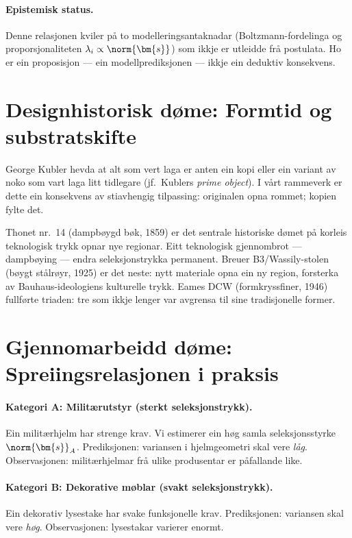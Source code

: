 \paragraph{Epistemisk status.}
Denne relasjonen kviler på to modelleringsantaknadar
(Boltzmann-fordelinga og proporsjonaliteten
$\lambda_i \propto \norm{\bm{s}}$) som ikkje er utleidde frå
postulata. Ho er ein proposisjon --- ein modellprediksjonen ---
ikkje ein deduktiv konsekvens.


\section{Designhistorisk døme: Formtid og substratskifte}

George Kubler hevda at alt som vert laga er anten ein kopi eller
ein variant av noko som vart laga litt tidlegare
(jf.\ Kublers \emph{prime object}). I vårt rammeverk er dette ein
konsekvens av stiavhengig tilpassing: originalen opna rommet;
kopien fylte det.

Thonet nr.~14 (dampbøygd bøk, 1859) er det sentrale historiske
dømet på korleis teknologisk trykk opnar nye regionar. Eitt
teknologisk gjennombrot --- dampbøying --- endra seleksjonstrykka
permanent. Breuer B3/Wassily-stolen (bøygt stålrøyr, 1925) er
det neste: nytt materiale opna ein ny region, forsterka av
Bauhaus-ideologiens kulturelle trykk. Eames DCW (formkryssfiner,
1946) fullførte triaden: tre som ikkje lenger var avgrensa til
sine tradisjonelle former.


\section{Gjennomarbeidd døme: Spreiingsrelasjonen i praksis}

\paragraph{Kategori A: Militærutstyr (sterkt seleksjonstrykk).}
Ein militærhjelm har strenge krav. Vi estimerer ein høg samla
seleksjonsstyrke $\norm{\bm{s}}_A$.
Prediksjonen: variansen i hjelmgeometri skal vere \emph{låg}.
Observasjonen: militærhjelmar frå ulike produsentar er påfallande
like.

\paragraph{Kategori B: Dekorative møblar (svakt seleksjonstrykk).}
Ein dekorativ lysestake har svake funksjonelle krav.
Prediksjonen: variansen skal vere \emph{høg}.
Observasjonen: lysestakar varierer enormt.

